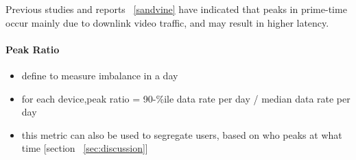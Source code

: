  Previous studies and reports ~\ref{sandvine} have indicated that peaks in prime-time occur mainly due to downlink video traffic, and may result in higher latency.

\paragraph{Peak Ratio}
\begin{itemize}
\itemsep0em
\item define to measure imbalance in a day
\item for each device,peak ratio  =    90-\%ile data rate per day / median data rate per day
\item this metric can also be used to segregate users, based on who peaks at what time [section ~\ref{sec:discussion}]
\end{itemize}

